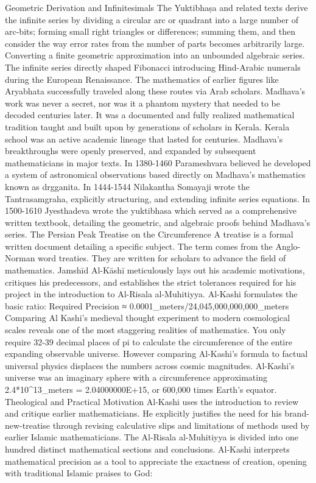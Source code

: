 {Geometric Derivation and Infinitesimals
The Yuktibhaṣa and related texts derive the infinite series by dividing a circular arc or quadrant into a large number of arc-bits; forming small right triangles or differences; summing them, and then consider the way error rates from the number of parts becomes arbitrarily large. Converting a finite geometric approximation into an unbounded algebraic series. The infinite series directly shaped Fibonacci introducing Hind-Arabic numerals during the European Renaissance. The mathematics of earlier figures like Aryabhata successfully traveled along these routes via Arab scholars. Madhava’s work was never a secret, nor was it a phantom mystery that needed to be decoded centuries later. It was a documented and fully realized mathematical tradition taught and built upon by generations of scholars in Kerala. 
Kerala school was an active academic lineage that lasted for centuries. Madhava’s breakthroughs were openly preserved, and expanded by subsequent mathematicians in major texts. In 1380-1460 Parameshvara believed he developed a system of astronomical observations based directly on Madhava’s mathematics known as drgganita. In 1444-1544 Nilakantha Somayaji wrote the Tantrasamgraha, explicitly structuring, and extending infinite series equations. In 1500-1610 Jyesthadeva wrote the yuktibhasa which served as a comprehensive written textbook, detailing the geometric, and algebraic proofs behind Madhava’s series.
The Persian Peak
Treatise on the Circumference
A treatise is a formal written document detailing a specific subject. The term comes from the Anglo-Norman word treaties. They are written for scholars to advance the field of mathematics. Jamshīd Al-Kāshī meticulously lays out his academic motivations, critiques his predecessors, and establishes the strict tolerances required for his project in the introduction to Al-Risala al-Muhitiyya. Al-Kashi formulates the basic ratio: 
Required Precision ≈ 0.0001_meters/24,045,000,000,000_meters
Comparing Al Kashi’s medieval thought experiment to modern cosmological scales reveals one of the most staggering realities of mathematics. You only require 32-39 decimal places of pi to calculate the circumference of the entire expanding observable universe. However comparing Al-Kashi’s formula to factual universal physics displaces the numbers across cosmic magnitudes. Al-Kashi’s universe was an imaginary sphere with a circumference approximating 2.4*10^13_meters = 2.04000000E+15, or 600,000 times Earth’s equator. 
Theological and Practical Motivation
Al-Kashi uses the introduction to review and critique earlier mathematicians. He explicitly justifies the need for his brand-new-treatise through revising calculative slips and limitations of methods used by earlier Islamic mathematicians. The Al-Risala al-Muhitiyya is divided into one hundred distinct mathematical sections and conclusions. Al-Kashi interprets mathematical precision as a tool to appreciate the exactness of creation, opening with traditional Islamic praises to God:
}
